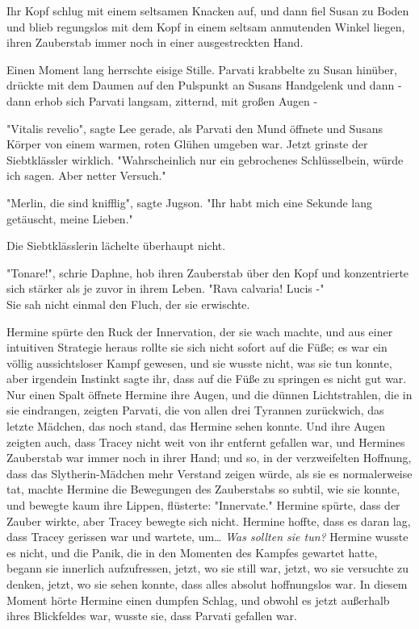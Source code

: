 {Ihr Kopf schlug mit einem seltsamen Knacken auf, und dann fiel Susan zu Boden und blieb regungslos mit dem Kopf in einem seltsam anmutenden Winkel liegen, ihren Zauberstab immer noch in einer ausgestreckten Hand.

Einen Moment lang herrschte eisige Stille. Parvati krabbelte zu Susan hinüber, drückte mit dem Daumen auf den Pulspunkt an Susans Handgelenk und dann - dann erhob sich Parvati langsam, zitternd, mit großen Augen -

"Vitalis revelio", sagte Lee gerade, als Parvati den Mund öffnete und Susans Körper von einem warmen, roten Glühen umgeben war. Jetzt grinste der Siebtklässler wirklich. "Wahrscheinlich nur ein gebrochenes Schlüsselbein, würde ich sagen. Aber netter Versuch."

"Merlin, die sind knifflig", sagte Jugson. "Ihr habt mich eine Sekunde lang getäuscht, meine Lieben."

Die Siebtklässlerin lächelte überhaupt nicht.

"Tonare!", schrie Daphne, hob ihren Zauberstab über den Kopf und konzentrierte sich stärker als je zuvor in ihrem Leben. "Rava calvaria! Lucis -"\\ Sie sah nicht einmal den Fluch, der sie erwischte.

Hermine spürte den Ruck der Innervation, der sie wach machte, und aus einer intuitiven Strategie heraus rollte sie sich nicht sofort auf die Füße; es war ein völlig aussichtsloser Kampf gewesen, und sie wusste nicht, was sie tun konnte, aber irgendein Instinkt sagte ihr, dass auf die Füße zu springen es nicht gut war. Nur einen Spalt öffnete Hermine ihre Augen, und die dünnen Lichtstrahlen, die in sie eindrangen, zeigten Parvati, die von allen drei Tyrannen zurückwich, das letzte Mädchen, das noch stand, das Hermine sehen konnte. Und ihre Augen zeigten auch, dass Tracey nicht weit von ihr entfernt gefallen war, und Hermines Zauberstab war immer noch in ihrer Hand; und so, in der verzweifelten Hoffnung, dass das Slytherin-Mädchen mehr Verstand zeigen würde, als sie es normalerweise tat, machte Hermine die Bewegungen des Zauberstabs so subtil, wie sie konnte, und bewegte kaum ihre Lippen, flüsterte: "Innervate." Hermine spürte, dass der Zauber wirkte, aber Tracey bewegte sich nicht. Hermine hoffte, dass es daran lag, dass Tracey gerissen war und wartete, um… \emph{Was sollten sie tun?} Hermine wusste es nicht, und die Panik, die in den Momenten des Kampfes gewartet hatte, begann sie innerlich aufzufressen, jetzt, wo sie still war, jetzt, wo sie versuchte zu denken, jetzt, wo sie sehen konnte, dass alles absolut hoffnungslos war. In diesem Moment hörte Hermine einen dumpfen Schlag, und obwohl es jetzt außerhalb ihres Blickfeldes war, wusste sie, dass Parvati gefallen war.

}
